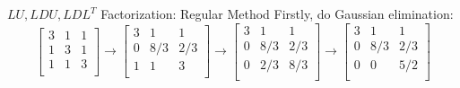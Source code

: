 \documentclass{beamer}
\begin{document}
\begin{frame}{$LU, LDU, LDL^T$ Factorization: Regular Method}
Firstly, do Gaussian elimination:
\begin{equation*}
    \left[ \begin{matrix}
        3&		1&		1\\
        1&		3&		1\\
        1&		1&		3\\
    \end{matrix} \right] \rightarrow \left[ \begin{matrix}
        3&		1&		1\\
        0&		8/3&		2/3\\
        1&		1&		3\\
    \end{matrix} \right] \rightarrow \left[ \begin{matrix}
        3&		1&		1\\
        0&		8/3&		2/3\\
        0&		2/3&		8/3\\
    \end{matrix} \right] \rightarrow \left[ \begin{matrix}
        3&		1&		1\\
        0&		8/3&		2/3\\
        0&		0&		5/2\\
    \end{matrix} \right]
\end{equation*}


\end{frame}
\end{document}
